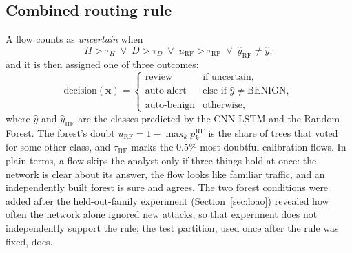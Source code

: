 \documentclass[conference]{IEEEtran}
\begin{document}
\subsection{Combined routing rule}
A flow counts as \emph{uncertain} when
\begin{equation}
H>\tau_H \;\lor\; D>\tau_D \;\lor\; u_{\mathrm{RF}}>\tau_{\mathrm{RF}} \;\lor\; \hat{y}_{\mathrm{RF}}\neq\hat{y},
\end{equation}
and it is then assigned one of three outcomes:
\begin{equation}
\text{decision}(\mathbf{x}) =
\begin{cases}
\text{review} & \text{if uncertain},\\
\text{auto-alert} & \text{else if } \hat{y}\neq\text{BENIGN},\\
\text{auto-benign} & \text{otherwise,}
\end{cases}
\end{equation}
where $\hat{y}$ and $\hat{y}_{\mathrm{RF}}$ are the classes predicted by the CNN-LSTM and the
Random Forest. The forest's doubt $u_{\mathrm{RF}} = 1-\max_k p^{\mathrm{RF}}_k$ is the share of
trees that voted for some other class, and $\tau_{\mathrm{RF}}$ marks the 0.5\% most
doubtful calibration flows. In plain terms, a flow skips the analyst only if three things hold at
once: the network is clear about its answer, the flow looks like familiar traffic, and an
independently built forest is sure and agrees. The two
forest conditions were added after the held-out-family experiment (Section~\ref{sec:loao}) revealed
how often the network alone ignored new attacks, so that experiment does not independently support
the rule; the test partition, used once after the rule was fixed, does.
\end{document}
